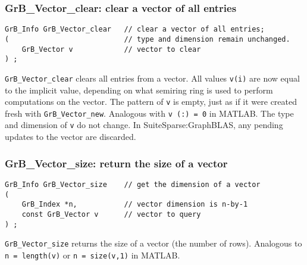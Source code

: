 \documentclass[12pt]{article}
\begin{document}
\newpage
\subsubsection{{\sf GrB\_Vector\_clear:}         clear a vector of all entries}
\label{vector_clear}

\begin{mdframed}[userdefinedwidth=6in]
{\footnotesize
\begin{verbatim}
GrB_Info GrB_Vector_clear   // clear a vector of all entries;
(                           // type and dimension remain unchanged.
    GrB_Vector v            // vector to clear
) ;
\end{verbatim}
} \end{mdframed}

\verb'GrB_Vector_clear' clears all entries from a vector.  All values
\verb'v(i)' are now equal to the implicit value, depending on what semiring
ring is used to perform computations on the vector.  The pattern of \verb'v' is
empty, just as if it were created fresh with \verb'GrB_Vector_new'.  Analogous
with \verb'v (:) = 0' in MATLAB.  The type and dimension of \verb'v' do not
change.  In SuiteSparse:GraphBLAS, any pending updates to the vector are
discarded.

\subsubsection{{\sf GrB\_Vector\_size:}          return the size of a vector}
\label{vector_size}

\begin{mdframed}[userdefinedwidth=6in]
{\footnotesize
\begin{verbatim}
GrB_Info GrB_Vector_size    // get the dimension of a vector
(
    GrB_Index *n,           // vector dimension is n-by-1
    const GrB_Vector v      // vector to query
) ;
\end{verbatim}
} \end{mdframed}

\verb'GrB_Vector_size' returns the size of a vector (the number of rows).
Analogous to \verb'n = length(v)' or \verb'n = size(v,1)' in MATLAB.

\newpage
\end{document}

